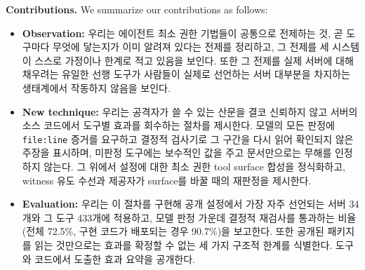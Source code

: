 \documentclass[acmsmall,screen,review,anonymous]{acmart}
\begin{document}
\noindent\textbf{Contributions.} We summarize our contributions as follows:
\begin{itemize}
    \item \textbf{Observation:} 우리는 에이전트 최소 권한 기법들이 공통으로 전제하는 것, 곧 도구마다 무엇에 닿는지가 이미 알려져 있다는 전제를 정리하고, 그 전제를 세 시스템이 스스로 가정이나 한계로 적고 있음을 보인다. 또한 그 전제를 실제 서버에 대해 채우려는 유일한 선행 도구가 사람들이 실제로 선언하는 서버 대부분을 차지하는 생태계에서 작동하지 않음을 보인다.
    \item \textbf{New technique:} 우리는 공격자가 쓸 수 있는 산문을 결코 신뢰하지 않고 서버의 소스 코드에서 도구별 효과를 회수하는 절차를 제시한다. 모델의 모든 판정에 \texttt{file:line} 증거를 요구하고 결정적 검사기로 그 구간을 다시 읽어 확인되지 않은 주장을 표시하며, 미판정 도구에는 보수적인 값을 주고 문서만으로는 무해를 인정하지 않는다. 그 위에서 설정에 대한 최소 권한 tool surface 합성을 정식화하고, witness 유도 수선과 제공자가 surface를 바꿀 때의 재판정을 제시한다.
    \item \textbf{Evaluation:} 우리는 이 절차를 구현해 공개 설정에서 가장 자주 선언되는 서버 34개와 그 도구 433개에 적용하고, 모델 판정 가운데 결정적 재검사를 통과하는 비율(전체 72.5\%, 구현 코드가 배포되는 경우 90.7\%)을 보고한다. 또한 공개된 패키지를 읽는 것만으로는 효과를 확정할 수 없는 세 가지 구조적 한계를 식별한다. 도구와 코드에서 도출한 효과 요약을 공개한다.
\end{itemize}
\end{document}
